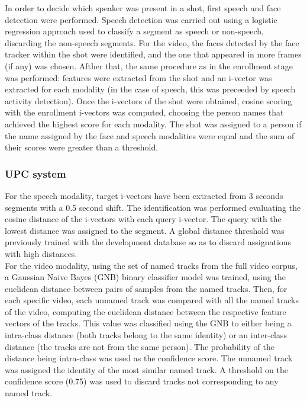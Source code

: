 In order to decide which speaker was present in a shot, first speech and face detection were performed. Speech detection was carried out using a logistic regression approach
used to classify a segment as speech or non-speech, discarding the non-speech segments. For the video, the faces detected by the face tracker within the shot were identified, 
and the one that appeared in more frames (if any) was chosen. Afther that, the same procedure as in the enrollment stage was performed: features were extracted from the shot
and an i-vector was extracted for each modality (in the case of speech, this was preceeded by speech activity detection). Once the i-vectors of the shot were obtained,
cosine scoring with the enrollment i-vectors was computed, choosing the person names that achieved the highest score for each modality. The shot was assigned to
a person if the name assigned by the face and
speech modalities were equal and the sum of their scores were greater than a threshold.

\subsubsection{UPC system}

For the speech modality, target i-vectors have been extracted from 3 seconds segments with a 0.5 second shift. The identification was performed evaluating the cosine distance of the i-vectors with each query i-vector. The query with the lowest distance was assigned to the segment. A global distance threshold was previously trained with the development database so as to discard assignations with high distances.\\

For the video modality, using the set of named tracks from the full video corpus, a Gaussian Naive Bayes (GNB) binary classifier model was trained, using the euclidean distance between pairs of samples from the named tracks. Then, for each specific video, each unnamed track was compared with all the named tracks of the video, computing the euclidean distance between the respective feature vectors of the tracks. This value was classified using the GNB to either being a intra-class distance (both tracks belong to the same identity) or an inter-class distance (the tracks are not from the same person). The probability of the distance being intra-class was used as the confidence score. The unnamed track was assigned the identity of the most similar named track. A threshold on the confidence score (0.75) was used to discard tracks not corresponding to any named track.

\endinput
